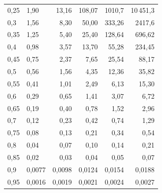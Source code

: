 \begin{table}
\begin{center}
\begin{tabular}{|l|l|r|r|r|r|}
0,25 & 1,90 & 13,16\hphantom{99} & 108,07\hphantom{99} & 1010,7\hphantom{999} & 10\,451,3\hphantom{999}\\


0,3  & 1,56 & 8,30\hphantom{99} & 50,00\hphantom{99} & 333,26\hphantom{99} & 2417,6\hphantom{999} \\


0,35 &1,25 & 5,40\hphantom{99} & 25,40\hphantom{99} & 128,64\hphantom{99} & 696,62\hphantom{99} \\


0,4 & 0,98 & 3,57\hphantom{99} & 13,70\hphantom{99} & 55,28\hphantom{99} & 234,45\hphantom{99} \\


0,45 & 0,75 & 2,37\hphantom{99} & 7,65\hphantom{99} & 25,54\hphantom{99} & 88,17\hphantom{99} \\


0,5 & 0,56 & 1,56\hphantom{99} & 4,35\hphantom{99} & 12,36\hphantom{99} & 35,82\hphantom{99} \\


0,55 & 0,41 & 1,01\hphantom{99} & 2,49\hphantom{99} & 6,13\hphantom{99} & 15,30\hphantom{99} \\


0,6 & 0,29 & 0,65\hphantom{99} & 1,41\hphantom{99}  & 3,07\hphantom{99} & 6,72\hphantom{99} \\


0,65 & 0,19 & 0,40\hphantom{99} & 0,78\hphantom{99} & 1,52\hphantom{99} & 2,96\hphantom{99} \\


0,7 & 0,12 & 0,23\hphantom{99} & 0,42\hphantom{99} & 0,74\hphantom{99} & 1,29\hphantom{99} \\


0,75 & 0,08 & 0,13\hphantom{99} & 0,21\hphantom{99} & 0,34\hphantom{99} & 0,54\hphantom{99}\\


0,8 & 0,04 & 0,07\hphantom{99} & 0,10\hphantom{99} & 0,14\hphantom{99} & 0,21\hphantom{99} \\


0,85 & 0,02 & 0,03\hphantom{99} & 0,04\hphantom{99} & 0,05\hphantom{99} & 0,07\hphantom{99}\\


0,9 & 0,0077 & 0,0098 & 0,0124& 0,0154& 0,0188\\


0,95 & 0,0016 & 0,0019 & 0,0021& 0,0024& 0,0027\\


\hline


\end{tabular}


\end{center}


\end{table}








